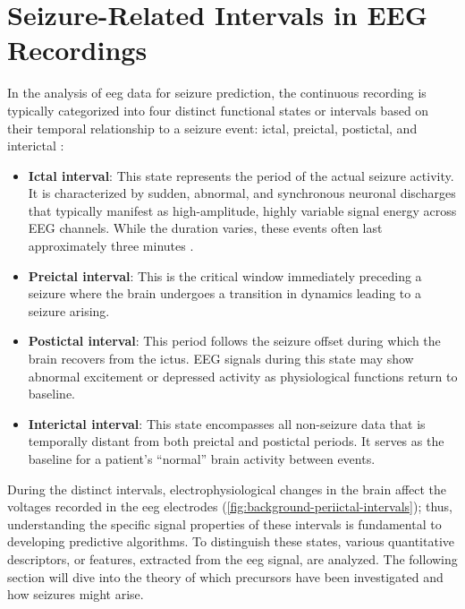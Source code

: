 \section{Seizure-Related Intervals in EEG Recordings}\label{subsec:background-periictal-intervals-in-eeg-recordings}

In the analysis of \gls{eeg} data for seizure prediction, the continuous recording is typically categorized into four distinct functional states or intervals based on their temporal relationship to a seizure event: ictal, preictal, postictal, and interictal \parencite{moghim_predicting_2014}:

\begin{itemize}
    \item \textbf{Ictal interval}: This state represents the period of the actual seizure activity. It is characterized by sudden, abnormal, and synchronous neuronal discharges that typically manifest as high-amplitude, highly variable signal energy across EEG channels. While the duration varies, these events often last approximately three minutes \parencite{moghim_predicting_2014}.
    \item \textbf{Preictal interval}: This is the critical window immediately preceding a seizure where the brain undergoes a transition in dynamics leading to a seizure arising.
    \item \textbf{Postictal interval}: This period follows the seizure offset during which the brain recovers from the ictus. EEG signals during this state may show abnormal excitement or depressed activity as physiological functions return to baseline.
    \item \textbf{Interictal interval}: This state encompasses all non-seizure data that is temporally distant from both preictal and postictal periods. It serves as the baseline for a patient's \enquote{normal} brain activity between events.
\end{itemize}

During the distinct intervals, electrophysiological changes in the brain affect the voltages recorded in the \gls{eeg} electrodes (\cref{fig:background-periictal-intervals}); thus, understanding the specific signal properties of these intervals is fundamental to developing predictive algorithms.
To distinguish these states, various quantitative descriptors, or features, extracted from the \gls{eeg} signal, are analyzed. 
The following section will dive into the theory of which precursors have been investigated and how seizures might arise.

